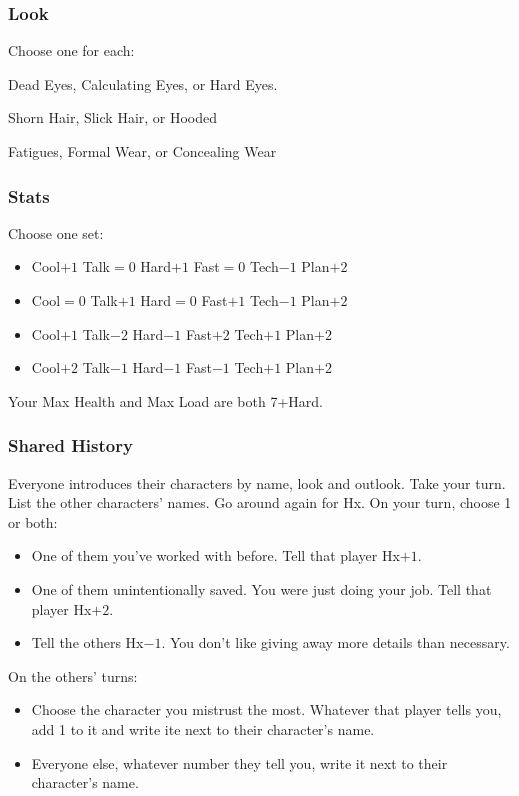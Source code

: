 \subsubsection{Look}
Choose one for each:

Dead Eyes, Calculating Eyes, or Hard Eyes.

Shorn Hair, Slick Hair, or Hooded

Fatigues, Formal Wear, or Concealing Wear

\subsubsection{Stats}
Choose one set:
\begin{itemize}
\setlength\itemsep{0em}
\item Cool$+1$ Talk${=}0$ Hard$+1$ Fast${=}0$ Tech$-1$ Plan$+2$
\item Cool${=}0$ Talk$+1$ Hard${=}0$ Fast$+1$ Tech$-1$ Plan$+2$
\item Cool$+1$ Talk$-2$ Hard$-1$ Fast$+2$ Tech$+1$ Plan$+2$
\item Cool$+2$ Talk$-1$ Hard$-1$ Fast$-1$ Tech$+1$ Plan$+2$
\end{itemize}

Your Max Health and Max Load are both 7+Hard.

\subsubsection{Shared History}
Everyone introduces their characters by name, look and outlook. Take
your turn. List the other characters' names. Go around again for
Hx. On your turn, choose 1 or both:
\begin{itemize} %
\item One of them you've worked with before. Tell that player Hx$+1$.
\item One of them unintentionally saved. You were just doing your job. Tell that player Hx$+2$.
\item Tell the others Hx$-1$. You don't like giving away more details than necessary.
\end{itemize}
On the others’ turns:
\begin{itemize} %
\item Choose the character you mistrust the most. Whatever that player
  tells you, add 1 to it and write ite next to their character's name.
\item Everyone else, whatever number they tell you, write it next to
  their character’s name.
\end{itemize}

